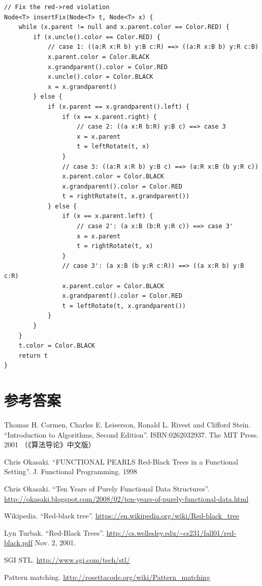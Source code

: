 \documentclass[b5paper]{ctexart}
\begin{document}
\begin{lstlisting}[language = Bourbaki]
// Fix the red->red violation
Node<T> insertFix(Node<T> t, Node<T> x) {
    while (x.parent != null and x.parent.color == Color.RED) {
        if (x.uncle().color == Color.RED) {
            // case 1: ((a:R x:R b) y:B c:R) ==> ((a:R x:B b) y:R c:B)
            x.parent.color = Color.BLACK
            x.grandparent().color = Color.RED
            x.uncle().color = Color.BLACK
            x = x.grandparent()
        } else {
            if (x.parent == x.grandparent().left) {
                if (x == x.parent.right) {
                    // case 2: ((a x:R b:R) y:B c) ==> case 3
                    x = x.parent
                    t = leftRotate(t, x)
                }
                // case 3: ((a:R x:R b) y:B c) ==> (a:R x:B (b y:R c))
                x.parent.color = Color.BLACK
                x.grandparent().color = Color.RED
                t = rightRotate(t, x.grandparent())
            } else {
                if (x == x.parent.left) {
                    // case 2': (a x:B (b:R y:R c)) ==> case 3'
                    x = x.parent
                    t = rightRotate(t, x)
                }
                // case 3': (a x:B (b y:R c:R)) ==> ((a x:R b) y:B c:R)
                x.parent.color = Color.BLACK
                x.grandparent().color = Color.RED
                t = leftRotate(t, x.grandparent())
            }
        }
    }
    t.color = Color.BLACK
    return t
}
\end{lstlisting}

\ifx\wholebook\relax \else
\section{参考答案}
\shipoutAnswer

\begin{thebibliography}{99}

Thomas H. Cormen, Charles E. Leiserson, Ronald L. Rivest and Clifford Stein.
``Introduction to Algorithms, Second Edition''. ISBN:0262032937. The MIT Press. 2001 （《算法导论》中文版）

Chris Okasaki. ``FUNCTIONAL PEARLS Red-Black Trees in a Functional Setting''. J. Functional Programming. 1998

Chris Okasaki. ``Ten Years of Purely Functional Data Structures''. \url{http://okasaki.blogspot.com/2008/02/ten-years-of-purely-functional-data.html}

Wikipedia. ``Red-black tree''. \url{https://en.wikipedia.org/wiki/Red-black_tree}

Lyn Turbak. ``Red-Black Trees''. \url{http://cs.wellesley.edu/~cs231/fall01/red-black.pdf} Nov. 2, 2001.

SGI STL. \url{http://www.sgi.com/tech/stl/}

Pattern matching. \url{http://rosettacode.org/wiki/Pattern_matching}

\end{thebibliography}

\expandafter\enddocument

\fi
\end{document}
